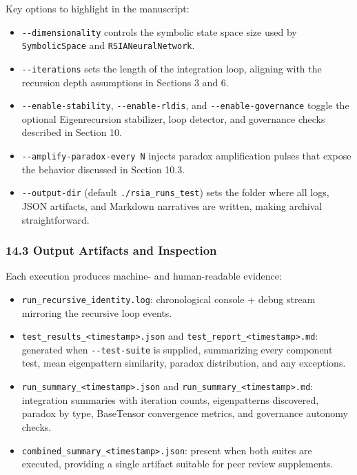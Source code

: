 \documentclass[12pt]{article}
\providecommand{\tightlist}{%
  \setlength{\itemsep}{0pt}\setlength{\parskip}{0pt}}
\begin{document}
Key options to highlight in the manuscript:

\begin{itemize}
\tightlist
\item
  \texttt{-\/-dimensionality} controls the symbolic state space size
  used by \texttt{SymbolicSpace} and \texttt{RSIANeuralNetwork}.
\item
  \texttt{-\/-iterations} sets the length of the integration loop,
  aligning with the recursion depth assumptions in Sections 3 and 6.
\item
  \texttt{-\/-enable-stability}, \texttt{-\/-enable-rldis}, and
  \texttt{-\/-enable-governance} toggle the optional Eigenrecursion
  stabilizer, loop detector, and governance checks described in Section
  10.
\item
  \texttt{-\/-amplify-paradox-every\ N} injects paradox amplification
  pulses that expose the behavior discussed in Section 10.3.
\item
  \texttt{-\/-output-dir} (default \texttt{./rsia\_runs\_test}) sets the
  folder where all logs, JSON artifacts, and Markdown narratives are
  written, making archival straightforward.
\end{itemize}

\subsubsection{14.3 Output Artifacts and
Inspection}\label{output-artifacts-and-inspection}

Each execution produces machine- and human-readable evidence:

\begin{itemize}
\tightlist
\item
  \texttt{run\_recursive\_identity.log}: chronological console + debug
  stream mirroring the recursive loop events.
\item
  \texttt{test\_results\_\textless{}timestamp\textgreater{}.json} and
  \texttt{test\_report\_\textless{}timestamp\textgreater{}.md}:
  generated when \texttt{-\/-test-suite} is supplied, summarizing every
  component test, mean eigenpattern similarity, paradox distribution,
  and any exceptions.
\item
  \texttt{run\_summary\_\textless{}timestamp\textgreater{}.json} and
  \texttt{run\_summary\_\textless{}timestamp\textgreater{}.md}:
  integration summaries with iteration counts, eigenpatterns discovered,
  paradox by type, BaseTensor convergence metrics, and governance
  autonomy checks.
\item
  \texttt{combined\_summary\_\textless{}timestamp\textgreater{}.json}:
  present when both suites are executed, providing a single artifact
  suitable for peer review supplements.
\end{itemize}
\end{document}
